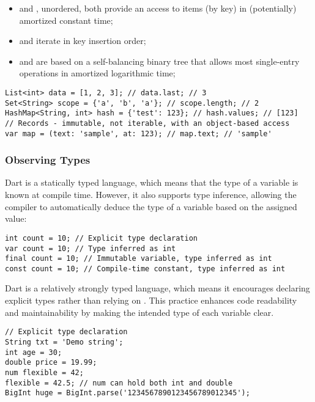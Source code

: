 \begin{itemize}
  \item {} and , unordered, both provide an access to items (by key) in (potentially) amortized
  constant time;
  \item {} and  iterate in key insertion order;
  \item {} and  are based on a self-balancing binary tree that allows most single-entry
  operations in amortized logarithmic time;
\end{itemize}

\begin{lstlisting}
List<int> data = [1, 2, 3]; // data.last; // 3
Set<String> scope = {'a', 'b', 'a'}; // scope.length; // 2
HashMap<String, int> hash = {'test': 123}; // hash.values; // [123]
// Records - immutable, not iterable, with an object-based access
var map = (text: 'sample', at: 123); // map.text; // 'sample'
\end{lstlisting}


\subsubsection{Observing Types}

Dart is a statically typed language, which means that the type of a variable is known at compile time. However, it also
supports type inference, allowing the compiler to automatically deduce the type of a variable based on the assigned value:

\begin{lstlisting}
int count = 10; // Explicit type declaration
var count = 10; // Type inferred as int
final count = 10; // Immutable variable, type inferred as int
const count = 10; // Compile-time constant, type inferred as int
\end{lstlisting}

\noindent Dart is a relatively strongly typed language, which means it encourages declaring explicit types rather than
relying on . This practice enhances code readability and maintainability by making the intended type of each
variable clear.

\begin{lstlisting}
// Explicit type declaration
String txt = 'Demo string';
int age = 30;
double price = 19.99;
num flexible = 42;
flexible = 42.5; // num can hold both int and double
BigInt huge = BigInt.parse('1234567890123456789012345');
\end{lstlisting}

